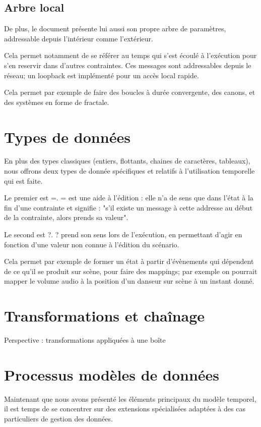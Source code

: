 \documentclass{sigchi}
\begin{document}
\subsection{Arbre local}
De plus, le document présente lui aussi son propre arbre de paramètres, addressable depuis l'intérieur comme l'extérieur.

Cela permet notamment de se référer au temps qui s'est écoulé à l'exécution pour s'en reservir dans d'autres contraintes. Ces messages sont addressables depuis le réseau; un loopback est implémenté pour un accès local rapide.

Cela permet par exemple de faire des boucles à durée convergente, des canons, et des systèmes en forme de fractale. %

\section{Types de données}
En plus des types classiques (entiers, flottants, chaines de caractères, tableaux),  nous offrons deux types de donnée spécifiques et relatifs à l'utilisation temporelle qui est faite.

Le premier est =. = est une aide à l'édition : elle n'a de sens que dans l'état à la fin d'une contrainte et signifie : "s'il existe un message à cette addresse au début de la contrainte, alors prends sa valeur".

Le second est ?. ? prend son sens lors de l'exécution, en permettant d'agir en fonction d'une valeur non connue à l'édition du scénario.

Cela permet par exemple de former un état à partir d'évènements qui dépendent de ce qu'il se produit sur scène, pour faire des mappings; par exemple on pourrait mapper le volume audio à la position d'un danseur sur scène à un instant donné.

\section{Transformations et chaînage}
Perspective : transformations appliquées à une boîte

\section{Processus modèles de données}
Maintenant que nous avons présenté les éléments principaux du modèle temporel, il est temps de se concentrer sur des extensions spécialisées adaptées à des cas particuliers de gestion des données.
\end{document}
